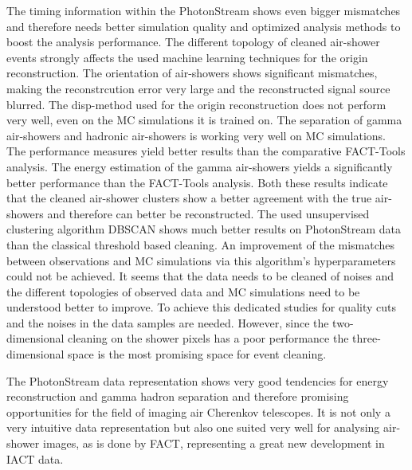 The timing information within the PhotonStream shows even bigger mismatches and
therefore needs better simulation quality and optimized analysis methods to
boost the analysis performance. The different topology of cleaned air-shower
events strongly affects the used machine learning techniques for the origin
reconstruction. The orientation of air-showers shows significant mismatches,
making the reconstrcution error very large and the reconstructed signal source
blurred. The disp-method used for the origin reconstruction does not perform
very well, even on the MC simulations it is trained on. The separation of gamma
air-showers and hadronic air-showers is working very well on MC simulations.
The performance measures yield better results than the comparative FACT-Tools
analysis. The energy estimation of the gamma air-showers yields a significantly
better performance than the FACT-Tools analysis. Both these results indicate
that the cleaned air-shower clusters show a better agreement with the true air-
showers and therefore can better be reconstructed. The used unsupervised
clustering algorithm DBSCAN shows much better results on PhotonStream data than
the classical threshold based cleaning. An improvement of the mismatches
between observations and MC simulations via this algorithm's hyperparameters
could not be achieved. It seems that the data needs to be cleaned of noises and
the different topologies of observed data and MC simulations need to be
understood better to improve. To achieve this dedicated studies for quality
cuts and the noises in the data samples are needed. However, since the two-dimensional cleaning on the shower pixels has a poor performance the three-dimensional space is the most promising space for event cleaning.

The PhotonStream data representation shows very good tendencies for energy
reconstruction and gamma hadron separation and therefore promising
opportunities for the field of imaging air Cherenkov telescopes. It is not only
a very intuitive data representation but also one suited very well for
analysing air-shower images, as is done by FACT, representing a great new development in IACT data.

